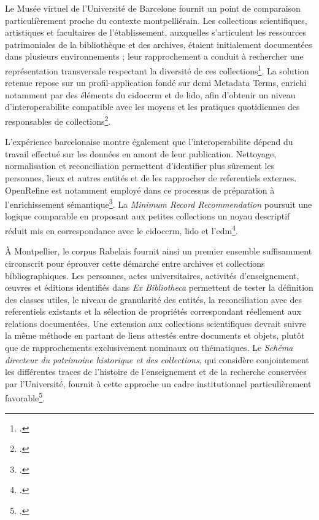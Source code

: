 Le Musée virtuel de l'Université de Barcelone fournit un point de comparaison particulièrement proche du contexte montpelliérain. Les collections scientifiques, artistiques et facultaires de l'établissement, auxquelles s'articulent les ressources patrimoniales de la bibliothèque et des archives, étaient initialement documentées dans plusieurs environnements ; leur rapprochement a conduit à rechercher une représentation transversale respectant la diversité de ces collections\footcite{SalseRoviraEtAl2024UniversityHeritage}. La solution retenue repose sur un \gls{profil-application} fondé sur \gls{dcmi} Metadata Terms, enrichi notamment par des éléments du \gls{cidoccrm} et de \gls{lido}, afin d'obtenir un niveau d'\gls{interoperabilite} compatible avec les moyens et les pratiques quotidiennes des responsables de collections\footcite{SalseRoviraMateoBretos2025DublinCore}.

L'expérience barcelonaise montre également que l'\gls{interoperabilite} dépend du travail effectué sur les données en amont de leur publication. Nettoyage, normalisation et \gls{reconciliation} permettent d'identifier plus sûrement les personnes, lieux et autres entités et de les rapprocher de \glspl{referentiel} externes. OpenRefine est notamment employé dans ce processus de préparation à l'enrichissement sémantique\footcite{SalseRoviraMateoBretos2025}. La \emph{Minimum Record Recommendation} poursuit une logique comparable en proposant aux petites collections un noyau descriptif réduit mis en correspondance avec le \gls{cidoccrm}, \gls{lido} et l'\gls{edm}\footcite{StadtlerStricker2024}.

À Montpellier, le corpus Rabelais fournit ainsi un premier ensemble suffisamment circonscrit pour éprouver cette démarche entre archives et collections bibliographiques. Les personnes, actes universitaires, activités d'enseignement, œuvres et éditions identifiés dans \emph{Ex Bibliotheca} permettent de tester la définition des classes utiles, le niveau de granularité des entités, la \gls{reconciliation} avec des \glspl{referentiel} existants et la sélection de propriétés correspondant réellement aux relations documentées. Une extension aux collections scientifiques devrait suivre la même méthode en partant de liens attestés entre documents et objets, plutôt que de rapprochements exclusivement nominaux ou thématiques. Le \emph{Schéma directeur du patrimoine historique et des collections}, qui considère conjointement les différentes traces de l'histoire de l'enseignement et de la recherche conservées par l'Université, fournit à cette approche un cadre institutionnel particulièrement favorable\footcite{UMSchemaDirecteurPatrimoine2025}.

